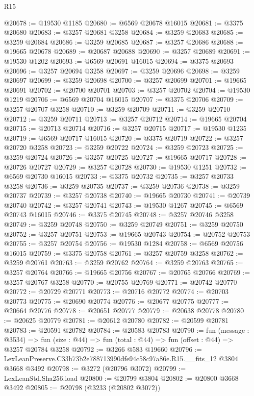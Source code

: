 \begin{lexlean}{R15}
\begin{coremodule}
@20678 := @19530 @1185
@20680 := @6569 @20678 @16015
@20681 := @3375 @20680
@20683 := @3257 @20681 @3258
@20684 := @3259 @20683
@20685 := @3259 @20684
@20686 := @3259 @20685
@20687 := @3257 @20686
@20688 := @19665 @20678
@20689 := @20687 @20688
@20690 := @3257 @20689
@20691 := @19530 @1202
@20693 := @6569 @20691 @16015
@20694 := @3375 @20693
@20696 := @3257 @20694 @3258
@20697 := @3259 @20696
@20698 := @3259 @20697
@20699 := @3259 @20698
@20700 := @3257 @20699
@20701 := @19665 @20691
@20702 := @20700 @20701
@20703 := @3257 @20702
@20704 := @19530 @1219
@20706 := @6569 @20704 @16015
@20707 := @3375 @20706
@20709 := @3257 @20707 @3258
@20710 := @3259 @20709
@20711 := @3259 @20710
@20712 := @3259 @20711
@20713 := @3257 @20712
@20714 := @19665 @20704
@20715 := @20713 @20714
@20716 := @3257 @20715
@20717 := @19530 @1235
@20719 := @6569 @20717 @16015
@20720 := @3375 @20719
@20722 := @3257 @20720 @3258
@20723 := @3259 @20722
@20724 := @3259 @20723
@20725 := @3259 @20724
@20726 := @3257 @20725
@20727 := @19665 @20717
@20728 := @20726 @20727
@20729 := @3257 @20728
@20730 := @19530 @1251
@20732 := @6569 @20730 @16015
@20733 := @3375 @20732
@20735 := @3257 @20733 @3258
@20736 := @3259 @20735
@20737 := @3259 @20736
@20738 := @3259 @20737
@20739 := @3257 @20738
@20740 := @19665 @20730
@20741 := @20739 @20740
@20742 := @3257 @20741
@20743 := @19530 @1267
@20745 := @6569 @20743 @16015
@20746 := @3375 @20745
@20748 := @3257 @20746 @3258
@20749 := @3259 @20748
@20750 := @3259 @20749
@20751 := @3259 @20750
@20752 := @3257 @20751
@20753 := @19665 @20743
@20754 := @20752 @20753
@20755 := @3257 @20754
@20756 := @19530 @1284
@20758 := @6569 @20756 @16015
@20759 := @3375 @20758
@20761 := @3257 @20759 @3258
@20762 := @3259 @20761
@20763 := @3259 @20762
@20764 := @3259 @20763
@20765 := @3257 @20764
@20766 := @19665 @20756
@20767 := @20765 @20766
@20769 := @3257 @20767 @3258
@20770 := @20755 @20769
@20771 := @20742 @20770
@20772 := @20729 @20771
@20773 := @20716 @20772
@20774 := @20703 @20773
@20775 := @20690 @20774
@20776 := @20677 @20775
@20777 := @20664 @20776
@20778 := @20651 @20777
@20779 := @20638 @20778
@20780 := @20625 @20779
@20781 := @20612 @20780
@20782 := @20599 @20781
@20783 := @20591 @20782
@20784 := @20583 @20783
@20790 := fun (message : @3534) =>
  fun (size : @44) => fun (total : @44) => fun (offset : @44) => @3257 @20784 @3258
@20792 := @3266 @583 @19660
@20796 := LexLeanPreserve.C33b73b2e788713990dfe94c58c97a86e.R15.__fits_12 @3804 @3668 @3492
@20798 := @3272 (@20796 @3072)
@20799 := LexLeanStd.Sha256.load
@20800 := @20799 @3804
@20802 := @20800 @3668 @3492
@20805 := @20798 (@3233 (@20802 @3072))

\end{coremodule}
\end{lexlean}
